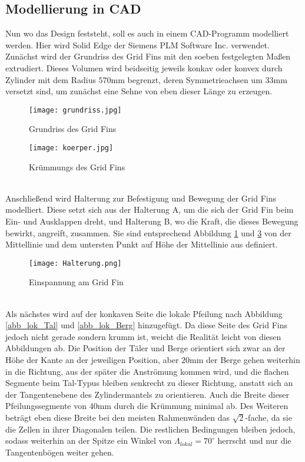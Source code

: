 \subsection{Modellierung in CAD}
Nun wo das Design feststeht, soll es auch in einem CAD-Programm modelliert werden. Hier wird Solid Edge der Siemens PLM Software Inc. verwendet. Zunächst wird der Grundriss des Grid Fins mit den soeben festgelegten Maßen extrudiert. Dieses Volumen wird beidseitig jeweils konkav oder konvex durch Zylinder mit dem Radius $570$mm begrenzt, deren Symmetrieachsen um $33$mm versetzt sind, um zunächst eine Sehne von eben dieser Länge zu erzeugen.
\begin{figure}[h]
	\centering
	\texttt{[image: grundriss.jpg]}
	\caption{Grundriss des Grid Fins}
	\label{abb_grundriss}
\end{figure}
\begin{figure}[h]
\centering
\texttt{[image: koerper.jpg]}
\caption{Krümmungs des Grid Fins}
\label{abb_körper}
\end{figure}\\
Anschließend wird Halterung zur Befestigung und Bewegung der Grid Fins modelliert. Diese setzt sich aus der Halterung A, um die sich der Grid Fin beim Ein- und Ausklappen dreht, und Halterung B, wo die Kraft, die dieses Bewegung bewirkt, angreift, zusammen. Sie sind entsprechend Abbildung \ref{abb_grundriss} und \ref{abb_halterung} von der Mittellinie und dem untersten Punkt auf Höhe der Mittellinie aus definiert.
\begin{figure}[h]
	\centering
	\texttt{[image: Halterung.png]}
	\caption{Einspannung am Grid Fin}
	\label{abb_halterung}
\end{figure}\\
Als nächstes wird auf der konkaven Seite die lokale Pfeilung nach Abbildung \ref{abb_lok_Tal} und \ref{abb_lok_Berg} hinzugefügt. Da diese Seite des Grid Fins jedoch nicht gerade sondern krumm ist, weicht die Realität leicht von diesen Abbildungen ab. Die Position der Täler und Berge orientiert sich zwar an der Höhe der Kante an der jeweiligen Position, aber $20$mm der Berge gehen weiterhin in die Richtung, aus der später die Anströmung kommen wird, und die flachen Segmente beim Tal-Typus bleiben senkrecht zu dieser Richtung, anstatt sich an der Tangentenebene des Zylindermantels zu orientieren. Auch die Breite dieser Pfeilungssegmente von $40$mm durch die Krümmung minimal ab. Des Weiteren beträgt eben diese Breite bei den meisten Rahmenwänden das $\sqrt{2}$-fache, da sie die Zellen in ihrer Diagonalen teilen. Die restlichen Bedingungen bleiben jedoch, sodass weiterhin an der Spitze ein Winkel von $\Lambda_{lokal} = 70^\circ$ herrscht und nur die Tangentenbögen weiter gehen.

